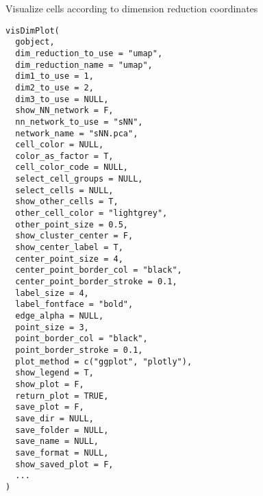 \documentclass[a4paper]{book}
\begin{document}
%
\begin{Description}\relax
Visualize cells according to dimension reduction coordinates
\end{Description}
%
\begin{Usage}
\begin{verbatim}
visDimPlot(
  gobject,
  dim_reduction_to_use = "umap",
  dim_reduction_name = "umap",
  dim1_to_use = 1,
  dim2_to_use = 2,
  dim3_to_use = NULL,
  show_NN_network = F,
  nn_network_to_use = "sNN",
  network_name = "sNN.pca",
  cell_color = NULL,
  color_as_factor = T,
  cell_color_code = NULL,
  select_cell_groups = NULL,
  select_cells = NULL,
  show_other_cells = T,
  other_cell_color = "lightgrey",
  other_point_size = 0.5,
  show_cluster_center = F,
  show_center_label = T,
  center_point_size = 4,
  center_point_border_col = "black",
  center_point_border_stroke = 0.1,
  label_size = 4,
  label_fontface = "bold",
  edge_alpha = NULL,
  point_size = 3,
  point_border_col = "black",
  point_border_stroke = 0.1,
  plot_method = c("ggplot", "plotly"),
  show_legend = T,
  show_plot = F,
  return_plot = TRUE,
  save_plot = F,
  save_dir = NULL,
  save_folder = NULL,
  save_name = NULL,
  save_format = NULL,
  show_saved_plot = F,
  ...
)
\end{verbatim}
\end{Usage}
%
\end{document}
